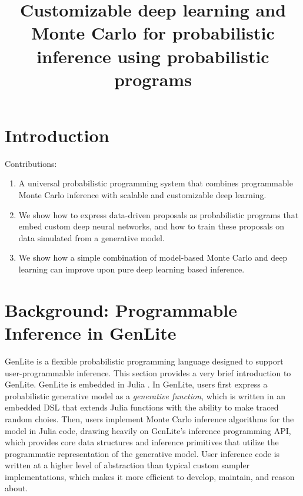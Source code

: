 \documentclass{article}
\title{Customizable deep learning and Monte Carlo for probabilistic inference using probabilistic programs}
\begin{document}
\maketitle

\begin{abstract}

\end{abstract}

\section{Introduction}

Contributions:
\begin{enumerate}
\item A universal probabilistic programming system that combines programmable Monte Carlo inference with scalable and customizable deep learning.
\item We show how to express data-driven proposals as probabilistic programs that embed custom deep neural networks, and how to train these proposals on data simulated from a generative model.
\item We show how a simple combination of model-based Monte Carlo and deep learning can improve upon pure deep learning based inference.
\end{enumerate}

\section{Background: Programmable Inference in GenLite}
GenLite \cite{TODO} is a flexible probabilistic programming language designed to support user-programmable inference.
This section provides a very brief introduction to GenLite.
GenLite is embedded in Julia \cite{TODO}.
In GenLite, users first express a probabilistic generative model as a \emph{generative function}, which is written in an embedded DSL that extends Julia functions with the ability to make traced random choies.
Then, users implement Monte Carlo inference algorithms for the model in Julia code, drawing heavily on GenLite's inference programming API, which provides core data structures and inference primitives that utilize the programmatic representation of the generative model.
User inference code is written at a higher level of abstraction than typical custom sampler implementations, which makes it more efficient to develop, maintain, and reason about.
\end{document}
